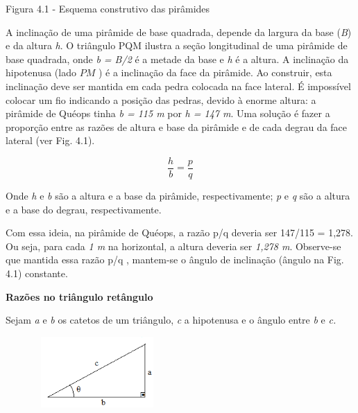 Figura 4.1 - Esquema construtivo das pirâmides

A inclinação de uma pirâmide de base quadrada, depende da largura da base (\textit{B}) e da altura \textit{h}. O triângulo PQM ilustra a seção longitudinal de uma pirâmide de base quadrada, onde \textit{b = B/2} é a metade da base e \textit{h} é a altura. A inclinação da hipotenusa (lado  \( PM \)  ) é a inclinação da face da pirâmide. Ao construir, esta inclinação deve ser mantida em cada pedra colocada na face lateral. É impossível colocar um fio indicando a posição das pedras, devido à enorme altura: a pirâmide de Quéops tinha \textit{b = 115 m} por \textit{h = 147 m}. Uma solução é fazer a proporção entre as razões de altura e base da pirâmide e de cada degrau da face lateral (ver Fig. 4.1).

 \[ \frac{h}{b}=\frac{p}{q} \]

Onde \textit{h} e \textit{b} são a altura e a base da pirâmide, respectivamente; \textit{p} e \textit{q} são a altura e a base do degrau, respectivamente.

Com essa ideia, na pirâmide de Quéops, a razão p/q deveria ser 147/115 = 1,278. Ou seja, para cada \textit{1 m} na horizontal, a altura deveria ser \textit{1,278 m}. Observe-se que mantida essa razão p/q , mantem-se o ângulo de inclinação (ângulo   na Fig. 4.1) constante.    

\textbf{Razões no triângulo retângulo}

Sejam \textit{a }e\textit{ b} os catetos de um triângulo, \textit{c} a hipotenusa e  o ângulo entre \textit{b }e\textit{ c.}

\begin{figure}[H]
    \begin{Center}
        \includegraphics[width=1.91in,height=1.07in]{capitulos/trigonometria_e_funcoes_trigonometricas/media/image21.png}
    \end{Center}
\end{figure}

